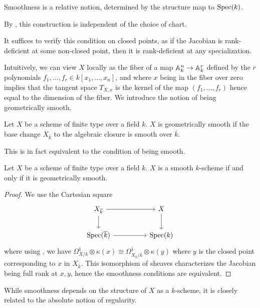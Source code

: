 \begin{remark}\label{rmk: smoothness is relative}
    Smoothness is a relative notion, determined by the structure map to $\operatorname{Spec}(k)$. 
\end{remark}
\begin{remark}
    By , this construction is independent of the choice of chart. 
\end{remark}
\begin{remark}\label{rmk: check smoothness on closed points}
    It suffices to verify this condition on closed points, as if the Jacobian is rank-deficient at some non-closed point, then it is rank-deficient at any specialization. 
\end{remark}
Intuitively, we can view $X$ locally as the fiber of a map $\mathbb{A}^{n}_{k}\to\mathbb{A}^{r}_{k}$ defined by the $r$ polynomials $f_{1},\dots,f_{r}\in k[x_{1},\dots,x_{n}]$, and where $x$ being in the fiber over zero implies that the tangent space $T_{X,x}$ is the kernel of the map $(f_{1},\dots,f_{r})$ hence equal to the dimension of the fiber. 
We introduce the notion of being geometrically smooth. 
\begin{definition}\label{def: geometrically smooth scheme}
    Let $X$ be a scheme of finite type over a field $k$. $X$ is geometrically smooth if the base change $X_{\overline{k}}$ to the algebraic closure is smooth over $\overline{k}$. 
\end{definition}
This is in fact equivalent to the condition of being smooth. 
\begin{lemma}\label{lem: smooth iff geometrically smooth}
    Let $X$ be a scheme of finite type over a field $k$. $X$ is a smooth $k$-scheme if and only if it is geometrically smooth. 
\end{lemma}
\begin{proof}
    We use the Cartesian square 
    $$%
    \begin{tikzcd}
        {X_{\overline{k}}} && X \\
        {\spec(\overline{k})} && {\spec(k)}
        \arrow[from=1-1, to=1-3]
        \arrow[from=1-1, to=2-1]
        \arrow[from=1-3, to=2-3]
        \arrow[from=2-1, to=2-3]
    \end{tikzcd}$$
    where using , we have $\Omega_{X/k}^{1}\otimes\kappa(x)\cong\Omega^{1}_{X_{\overline{k}}/\overline{k}}\otimes\kappa(y)$ where $y$ is the closed point corresponding to $x$ in $X_{\overline{k}}$. This isomorphism of sheaves characterizes the Jacobian being full rank at $x,y$, hence the smoothness conditions are equivalent. 
\end{proof}
While smoothness depends on the structure of $X$ as a $k$-scheme, it is closely related to the absolute notion of regularity. 

